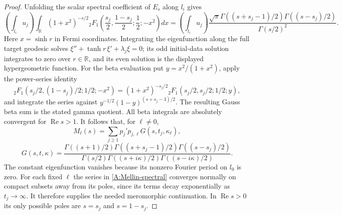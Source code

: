 \begin{proof}
Unfolding the scalar spectral coefficient of $E_s$ along $l_i$ gives
\[
 \left(\int_{l_i}u_j\right)
 \int_{\mathbb R}(1+x^2)^{-s/2}
 {}_2F_1\left(\frac{s_j}{2},\frac{1-s_j}{2};\frac12;-x^2\right)dx
 =\left(\int_{l_i}u_j\right)
 \frac{\sqrt\pi\Gamma((s+s_j-1)/2)\Gamma((s-s_j)/2)}{\Gamma(s/2)^2}.
\]
Here $x=\sinh r$ in Fermi coordinates. Integrating the eigenfunction
along the full target geodesic solves
$\xi''+\tanh r\,\xi'+\lambda_j\xi=0$; its odd initial-data solution
integrates to zero over $r\in\mathbb R$, and its even solution is
the displayed hypergeometric function. For the beta evaluation put
$y=x^2/(1+x^2)$, apply the power-series identity
\[
 {}_2F_1(s_j/2,(1-s_j)/2;1/2;-x^2)
 =(1+x^2)^{-s_j/2}{}_2F_1(s_j/2,s_j/2;1/2;y),
\]
and integrate the series against
$y^{-1/2}(1-y)^{(s+s_j-3)/2}$. The resulting Gauss beta sum
is the stated gamma quotient. All beta integrals are absolutely
convergent for $\operatorname{Re}s>1$.
It follows that, for $\ell\ne0$,
\begin{equation}\label{A:Mellin-spectral}
 M_\ell(s)=\sum_{j\geq1}p_j'p_{j,\ell}G(s,t_j,\kappa_\ell),
\end{equation}
\[
 G(s,t,\kappa)=
 \frac{\Gamma((s+1)/2)\Gamma((s+s_j-1)/2)\Gamma((s-s_j)/2)}
 {\Gamma(s/2)\Gamma((s+i\kappa)/2)\Gamma((s-i\kappa)/2)}.
\]
The constant eigenfunction vanishes because its nonzero Fourier
period on $l_0$ is zero. For each fixed $\ell$ the series in
\eqref{A:Mellin-spectral} converges normally on compact subsets away
from its poles, since its terms decay exponentially as
$t_j\to\infty$. It therefore supplies the needed meromorphic
continuation. In $\operatorname{Re}s>0$ its only possible poles are
$s=s_j$ and $s=1-s_j$.


\end{proof}
